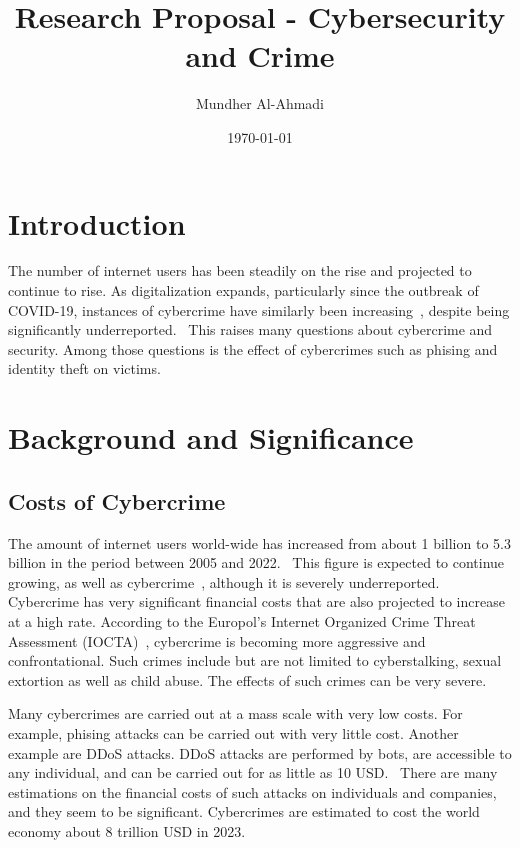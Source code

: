 \documentclass[12pt]{article}
\title{Research Proposal - Cybersecurity and Crime}
\author{Mundher Al-Ahmadi}
\date{\today}
\begin{document}
\maketitle

\section{Introduction}

The number of internet users has been steadily on the rise and projected to
continue to rise. As digitalization expands, particularly since the 
outbreak of COVID-19, instances of cybercrime have similarly been 
increasing~\cite{Monteith2021Increasing}, despite being significantly underreported.~\cite{IOCTA2021} 
This raises many questions about cybercrime and security. Among those questions is
the effect of cybercrimes such as phising and identity theft on victims.

\section{Background and Significance}

\subsection{Costs of Cybercrime}

The amount of internet users world-wide has increased from about 1 billion
to 5.3 billion in the period between 2005 and 2022.~\cite{StatistaInternetUsers}
This figure is expected to continue growing, as well as cybercrime~\cite{rise-of-cybercrime},
although it is severely underreported. Cybercrime has very significant
financial costs that are also projected to increase at a high rate. 
According to the Europol's Internet Organized Crime Threat Assessment (IOCTA)~\cite{IOCTA2021}, 
cybercrime is becoming more aggressive and confrontational.
Such crimes include but are not limited to cyberstalking, sexual extortion
as well as child abuse. The effects of such crimes can be very severe.~\cite{IOCTA2021}

Many cybercrimes are carried out at a mass scale with very low costs. For example,
phising attacks can be carried out with very little cost. Another example are 
DDoS attacks. DDoS attacks are performed by bots, are accessible to any individual,
and can be carried out for as little as 10 USD.~\cite{gomez2020dark}
There are many estimations on the financial costs of such attacks on individuals and companies,
and they seem to be significant. Cybercrimes are estimated to cost the world economy
about 8 trillion USD in 2023.~\cite{cybersecurity-ventures-cybercrime-report}
\end{document}

